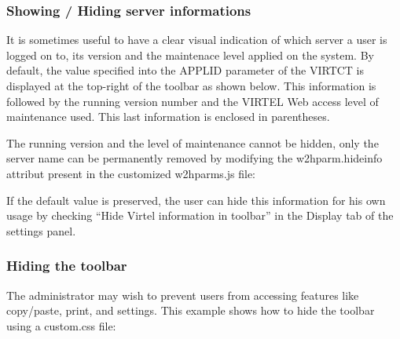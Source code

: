 \documentclass[letterpaper,10pt,english]{sphinxmanual}
\begin{document}


\subsubsection{Showing / Hiding server informations}
\label{\detokenize{User_Guide:showing-hiding-server-informations}}\label{\detokenize{User_Guide:v457ug-hide-information}}
It is sometimes useful to have a clear visual indication of which server a user is logged on to, its version and the
maintenace level applied on the system. By default, the value specified into the APPLID parameter of the VIRTCT is
displayed at the top-right of the toolbar as shown below. This information is followed by the running version number
and the VIRTEL Web access level of maintenance used. This last information is enclosed in parentheses.


The running version and the level of maintenance cannot be hidden, only the server name can be permanently
removed by modifying the w2hparm.hideinfo attribut present in the customized w2hparms.js file:

\begin{sphinxVerbatim}[commandchars=\\\{\}]
       
  
\end{sphinxVerbatim}


If the default value is preserved, the user can hide this information for his own usage by checking “Hide Virtel
information in toolbar” in the Display tab of the settings panel.


\subsubsection{Hiding the toolbar}
\label{\detokenize{User_Guide:v457ug-hide-toolbar}}\label{\detokenize{User_Guide:hiding-the-toolbar}}
The administrator may wish to prevent users from accessing features like copy/paste, print, and settings. This example
shows how to hide the toolbar using a custom.css file:
\end{document}
